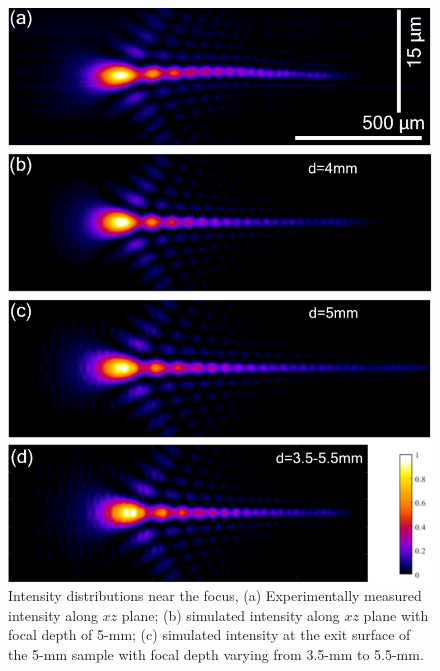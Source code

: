 \documentclass[9pt,twocolumn,twoside]{osajnl}
\begin{document}
\begin{figure}[t]
	\centering
	\includegraphics[width=\linewidth]{../AppOptics/figures/50xSi.pdf}
	\caption{Intensity distributions near the focus, (a) Experimentally measured intensity along $xz$ plane; (b) simulated intensity along $xz$ plane with focal depth of 5-mm; (c) simulated intensity at the exit surface of the 5-mm sample with focal depth varying from 3.5-mm to 5.5-mm.}\label{fig:5}
\end{figure}
\end{document}
